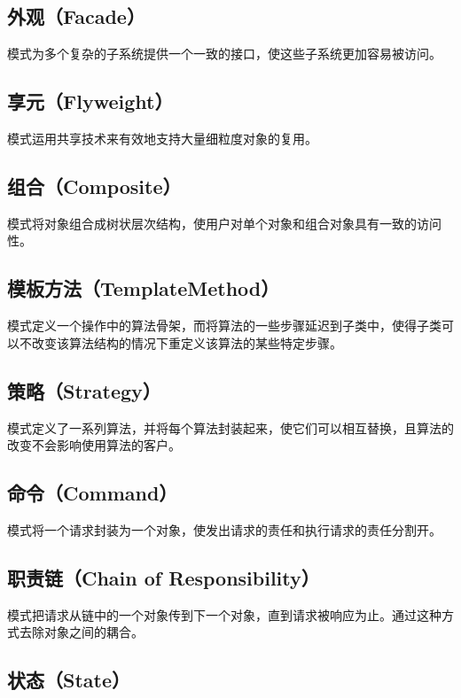 \documentclass[cn,black,12pt,normal]{elegantnote}
\begin{document}
\subsection{外观（Facade）}

模式为多个复杂的子系统提供一个一致的接口，使这些子系统更加容易被访问。

\subsection{享元（Flyweight）}

模式运用共享技术来有效地支持大量细粒度对象的复用。


\subsection{组合（Composite）}

模式将对象组合成树状层次结构，使用户对单个对象和组合对象具有一致的访问性。

\subsection{模板方法（TemplateMethod）}

模式定义一个操作中的算法骨架，而将算法的一些步骤延迟到子类中，使得子类可以不改变该算法结构的情况下重定义该算法的某些特定步骤。

\subsection{策略（Strategy）}

模式定义了一系列算法，并将每个算法封装起来，使它们可以相互替换，且算法的改变不会影响使用算法的客户。

\subsection{命令（Command）}

模式将一个请求封装为一个对象，使发出请求的责任和执行请求的责任分割开。

\subsection{职责链（Chain of Responsibility）}

模式把请求从链中的一个对象传到下一个对象，直到请求被响应为止。通过这种方式去除对象之间的耦合。

\subsection{状态（State）}
\end{document}

